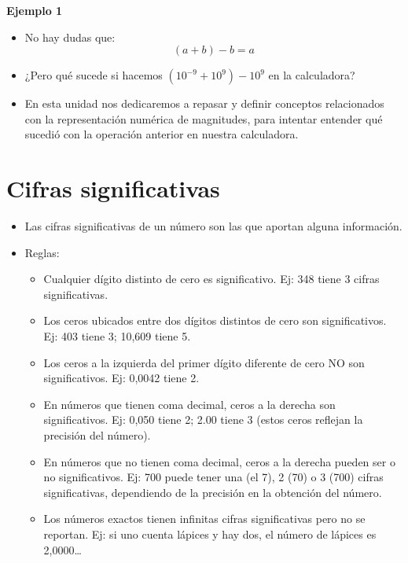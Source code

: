\documentclass[]{book}
\providecommand{\tightlist}{%
  \setlength{\itemsep}{0pt}\setlength{\parskip}{0pt}}
\begin{document}
\textbf{Ejemplo 1}

\begin{itemize}
\item
  No hay dudas que:
  \[ (a + b) - b = a \]
\item
  ¿Pero qué sucede si hacemos \((10^{-9} + 10^9) - 10^9\) en la calculadora?
\item
  En esta unidad nos dedicaremos a repasar y definir conceptos relacionados con la representación numérica de magnitudes, para intentar entender qué sucedió con la operación anterior en nuestra calculadora.
\end{itemize}

\hypertarget{cifras-significativas}{%
\section{Cifras significativas}\label{cifras-significativas}}

\begin{itemize}
\tightlist
\item
  Las cifras significativas de un número son las que aportan alguna información.
\item
  Reglas:

  \begin{itemize}
  \tightlist
  \item
    Cualquier dígito distinto de cero es significativo. Ej: 348 tiene 3 cifras significativas.
  \item
    Los ceros ubicados entre dos dígitos distintos de cero son significativos. Ej: 403 tiene 3; 10,609 tiene 5.
  \item
    Los ceros a la izquierda del primer dígito diferente de cero NO son significativos. Ej: 0,0042 tiene 2.
  \item
    En números que tienen coma decimal, ceros a la derecha son significativos. Ej: 0,050 tiene 2; 2.00 tiene 3 (estos ceros reflejan la precisión del número).
  \item
    En números que no tienen coma decimal, ceros a la derecha pueden ser o no significativos. Ej: 700 puede tener una (el 7), 2 (70) o 3 (700) cifras significativas, dependiendo de la precisión en la obtención del número.
  \item
    Los números exactos tienen infinitas cifras significativas pero no se reportan. Ej: si uno cuenta lápices y hay dos, el número de lápices es 2,0000\ldots{}
  \end{itemize}
\end{itemize}
\end{document}

